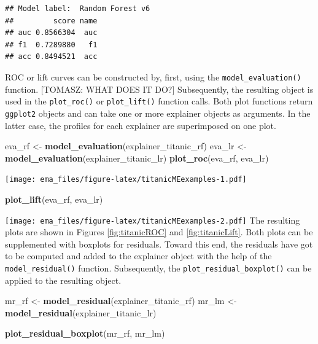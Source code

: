 \documentclass[12pt,]{krantz}
\newenvironment{Shaded}{\begin{snugshade}}{\end{snugshade}}
\newcommand{\KeywordTok}[1]{\textcolor[rgb]{0.13,0.29,0.53}{\textbf{#1}}}
\newcommand{\NormalTok}[1]{#1}
\newcommand{\StringTok}[1]{\textcolor[rgb]{0.31,0.60,0.02}{#1}}
\begin{document}
\begin{verbatim}
## Model label:  Random Forest v6 
##         score name
## auc 0.8566304  auc
## f1  0.7289880   f1
## acc 0.8494521  acc
\end{verbatim}

ROC or lift curves can be constructed by, first, using the \texttt{model\_evaluation()} function. {[}TOMASZ: WHAT DOES IT DO?{]} Subsequently, the resulting object is used in the \texttt{plot\_roc()} or \texttt{plot\_lift()} function calls. Both plot functions return \texttt{ggplot2} objects and can take one or more explainer objects as arguments. In the latter case, the profiles for each explainer are superimposed on one plot.

\begin{Shaded}
\begin{Highlighting}[]
\NormalTok{eva_rf <-}\StringTok{ }\KeywordTok{model_evaluation}\NormalTok{(explainer_titanic_rf)}
\NormalTok{eva_lr <-}\StringTok{ }\KeywordTok{model_evaluation}\NormalTok{(explainer_titanic_lr)}
\KeywordTok{plot_roc}\NormalTok{(eva_rf, eva_lr)}
\end{Highlighting}
\end{Shaded}

\texttt{[image: ema\_files/figure-latex/titanicMEexamples-1.pdf]}

\begin{Shaded}
\begin{Highlighting}[]
\KeywordTok{plot_lift}\NormalTok{(eva_rf, eva_lr)}
\end{Highlighting}
\end{Shaded}

\texttt{[image: ema\_files/figure-latex/titanicMEexamples-2.pdf]}
The resulting plots are shown in Figures \ref{fig:titanicROC} and \ref{fig:titanicLift}. Both plots can be supplemented with boxplots for residuals. Toward this end, the residuals have got to be computed and added to the explainer object with the help of the \texttt{model\_residual()} function. Subsequently, the \texttt{plot\_residual\_boxplot()} can be applied to the resulting object.

\begin{Shaded}
\begin{Highlighting}[]
\NormalTok{mr_rf <-}\StringTok{ }\KeywordTok{model_residual}\NormalTok{(explainer_titanic_rf)}
\NormalTok{mr_lm <-}\StringTok{ }\KeywordTok{model_residual}\NormalTok{(explainer_titanic_lr)}

\KeywordTok{plot_residual_boxplot}\NormalTok{(mr_rf, mr_lm)}
\end{Highlighting}
\end{Shaded}
\end{document}
